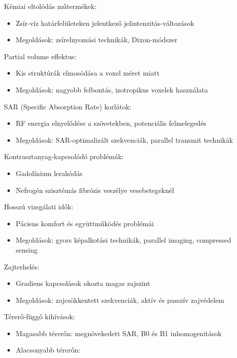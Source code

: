 \documentclass[a4paper,12pt]{article}
\begin{document}
 \item Kémiai eltolódás műtermékek: \begin{itemize} \item Zsír-víz határfelületeken jelentkező jelintenzitás-változások \item Megoldások: zsírelnyomási technikák, Dixon-módszer \end{itemize} \item Partial volume effektus: \begin{itemize} \item Kis struktúrák elmosódása a voxel méret miatt \item Megoldások: nagyobb felbontás, izotropikus voxelek használata \end{itemize} \item SAR (Specific Absorption Rate) korlátok: \begin{itemize} \item RF energia elnyelődése a szövetekben, potenciális felmelegedés \item Megoldások: SAR-optimalizált szekvenciák, parallel transmit technikák \end{itemize} \item Kontrasztanyag-kapcsolódó problémák: \begin{itemize} \item Gadolínium lerakódás \item Nefrogén szisztémás fibrózis veszélye vesebetegeknél \end{itemize} \item Hosszú vizsgálati idők: \begin{itemize} \item Páciens komfort és együttműködés problémái \item Megoldások: gyors képalkotási technikák, parallel imaging, compressed sensing \end{itemize} \item Zajterhelés: \begin{itemize} \item Gradiens kapcsolások okozta magas zajszint \item Megoldások: zajcsökkentett szekvenciák, aktív és passzív zajvédelem \end{itemize} \item Térerő-függő kihívások: \begin{itemize} \item Magasabb térerőn: megnövekedett SAR, B0 és B1 inhomogenitások \item Alacsonyabb térerőn: 
\end{itemize}
\end{document}
